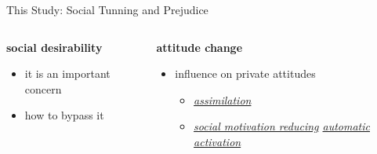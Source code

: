 \begin{frame}{This Study: Social Tunning and Prejudice}
    \begin{columns}[T]
        \begin{column}{0.45\textwidth}
            \begin{block}{\textbf{social desirability}}
                \begin{itemize}
                    \item it is an important concern {\footnotesize \citep{crosby1980recent}}
                    \item how to bypass it {\footnotesize \citep{greenwald1995implicit,fazio1995variability} }
                \end{itemize}
            \end{block}
        \end{column}

        \begin{column}{0.45\textwidth}
            \begin{block}{\textbf{attitude change}}
                \begin{itemize}
                    \item influence on private attitudes
                    \begin{itemize}
                        \footnotesize
                        \item \textit{\underline{assimilation}} \citep{blanchard1991reducing}
                        \item \textit{\underline{social motivation reducing} \underline{automatic activation}} \citep{sinclair1999reactions}
                    \end{itemize}
                \end{itemize}
            \end{block}
        \end{column}
    \end{columns}
\end{frame}

